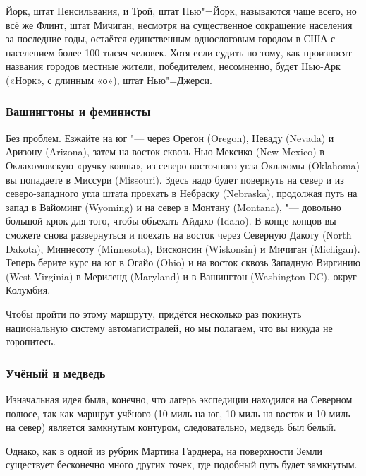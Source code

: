 \documentclass[twoside]{book}
\begin{document}
Йорк, штат Пенсильвания, и Трой, штат Нью"=Йорк, называются чаще всего, но всё же Флинт, штат Мичиган, несмотря на существенное сокращение населения за последние годы, остаётся единственным однослоговым городом в США с населением более 100 тысяч человек.
Хотя если судить по тому, как произносят названия городов местные жители, победителем, несомненно, будет Нью-Арк («Норк», с длинным «о»), штат Нью"=Джерси.%
\heart

\subsubsection*{Вашингтоны и феминисты} %

{\sloppy 

Без проблем.
Езжайте на юг "--- через Орегон (Oregon), 
Неваду (Nevada) 
и Аризону (Arizona), 
затем на восток сквозь Нью-Мексико (New Mexico) 
в Оклахомовскую «ручку ковша», из северо-восточного угла Оклахомы (Oklahoma) 
вы попадаете в Миссури (Mis\-sou\-ri).
Здесь надо будет повернуть на север и из северо-западного угла штата проехать в Небраску (Nebraska), продолжая путь на запад в Вайоминг (Wyoming) и на север в Монтану (Montana), "--- довольно большой крюк для того, чтобы объехать Айдахо (Idaho).
В конце концов вы сможете снова развернуться и поехать на восток через Северную Дакоту (North Dakota), 
Миннесоту (Minnesota), 
Висконсин (Wiskonsin) 
и Мичиган (Michigan).
Теперь берите курс на юг в Огайо (Ohio) и на восток сквозь Западную Виргинию (West Virginia) в Мериленд (Maryland)
 и в Вашингтон (Washington DC), округ Колумбия.\heart
 
}

Чтобы пройти по этому маршруту, придётся несколько раз 
покинуть национальную систему автомагистралей, но мы полагаем, что вы никуда не торопитесь.

\subsubsection*{Учёный и медведь}%

Изначальная идея была, конечно, что лагерь экспедиции находился на Северном полюсе, так как маршрут учёного (10 миль на юг, 10 миль на восток и 10 миль на север) является замкнутым контуром, %
следовательно, медведь был белый.

Однако, как  в одной из рубрик %
Мартина Гарднера, %
на поверхности Земли существует бесконечно много других точек, где подобный путь будет замкнутым.
\end{document}
